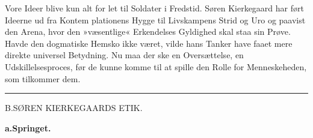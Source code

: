 \documentclass[12pt,a4paper,openany]{book}
\newcommand{\opage}[1]{\marginnote{\footnotesize\textit{[#1]}}}
\begin{document}
Vore Ideer blive kun alt for let til Soldater i Fredstid.
Søren Kierkegaard har ført Ideerne ud fra Kontem%
\opage{70}plationens Hygge til Livskampens Strid og Uro og paavist
den Arena, hvor den »væsentlige« Erkendelses
Gyldighed skal staa sin Prøve. Havde den dogmatiske
Hemsko ikke været, vilde hans Tanker have faaet mere
direkte universel Betydning. Nu maa der ske en Oversættelse,
en Udskillelsesproces, før de kunne komme til
at spille den Rolle for Menneskeheden, som tilkommer
dem.

\begin{center}\rule{3cm}{0.4pt}\end{center}

\begin{center}B.\enspace SØREN KIERKEGAARDS ETIK.\end{center}

\begin{center}\textbf{a.\enspace Springet.}\end{center}
\end{document}
